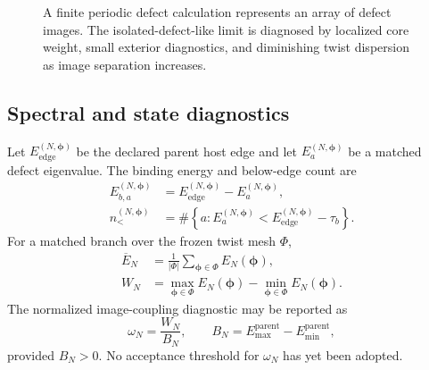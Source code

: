 \documentclass[11pt]{article}
\begin{document}
\begin{figure}[htbp]
  \centering
  \caption{A finite periodic defect calculation represents an array of defect images.
  The isolated-defect-like limit is diagnosed by localized core weight, small exterior
  diagnostics, and diminishing twist dispersion as image separation increases.}
  \label{fig:periodic-defect-images}
\end{figure}

\subsection{Spectral and state diagnostics}

Let $E_{\mathrm{edge}}^{(N,\boldsymbol\phi)}$ be the declared parent host edge and let
$E_a^{(N,\boldsymbol\phi)}$ be a matched defect eigenvalue.  The binding energy and
below-edge count are
\begin{align}
  E_{b,a}^{(N,\boldsymbol\phi)}
  &=E_{\mathrm{edge}}^{(N,\boldsymbol\phi)}
    -E_a^{(N,\boldsymbol\phi)},\\
  n_{<}^{(N,\boldsymbol\phi)}
  &=\#\left\{a:
    E_a^{(N,\boldsymbol\phi)}
    <E_{\mathrm{edge}}^{(N,\boldsymbol\phi)}-\tau_b
  \right\}.
\end{align}
For a matched branch over the frozen twist mesh $\Phi$,
\begin{align}
  \overline E_N&=\frac{1}{|\Phi|}
    \sum_{\boldsymbol\phi\in\Phi}E_N(\boldsymbol\phi),\\
  W_N&=\max_{\boldsymbol\phi\in\Phi}E_N(\boldsymbol\phi)
      -\min_{\boldsymbol\phi\in\Phi}E_N(\boldsymbol\phi).
  \label{eq:defect-band-width}
\end{align}
The normalized image-coupling diagnostic may be reported as
\begin{equation}
  \omega_N=\frac{W_N}{B_N},
  \qquad
  B_N=E_{\max}^{\mathrm{parent}}-E_{\min}^{\mathrm{parent}},
  \label{eq:normalized-band-width}
\end{equation}
provided $B_N>0$.  No acceptance threshold for $\omega_N$ has yet been adopted.
\end{document}
